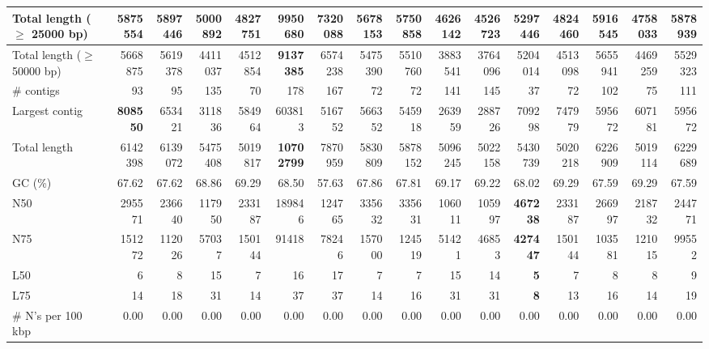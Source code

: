 \documentclass[12pt,a4paper]{article}
\begin{document}
\begin{table}[ht]
\begin{center}
\begin{tabular}{|l*{15}{|r}|}
Total length ($\geq$ 25000 bp) & 5875554 & 5897446 & 5000892 & 4827751 & {\bf 9950680} & 7320088 & 5678153 & 5750858 & 4626142 & 4526723 & 5297446 & 4824460 & 5916545 & 4758033 & 5878939 \\ \hline
Total length ($\geq$ 50000 bp) & 5668875 & 5619378 & 4411037 & 4512854 & {\bf 9137385} & 6574238 & 5475390 & 5510760 & 3883541 & 3764096 & 5204014 & 4513098 & 5655941 & 4469259 & 5529323 \\ \hline
\# contigs & 93 & 95 & 135 & 70 & 178 & 167 & 72 & 72 & 141 & 145 & 37 & 72 & 102 & 75 & 111 \\ \hline
Largest contig & {\bf 808550} & 653421 & 311836 & 584964 & 603813 & 516752 & 566352 & 545918 & 263959 & 288726 & 709298 & 747979 & 595672 & 607181 & 595672 \\ \hline
Total length & 6142398 & 6139072 & 5475408 & 5019817 & {\bf 10702799} & 7870959 & 5830809 & 5878152 & 5096245 & 5022158 & 5430739 & 5020218 & 6226909 & 5019114 & 6229689 \\ \hline
GC (\%) & 67.62 & 67.62 & 68.86 & 69.29 & 68.50 & 57.63 & 67.86 & 67.81 & 69.17 & 69.22 & 68.02 & 69.29 & 67.59 & 69.29 & 67.59 \\ \hline
N50 & 295571 & 236640 & 117950 & 233187 & 189846 & 124765 & 335632 & 335631 & 106011 & 105997 & {\bf 467238} & 233187 & 266997 & 218732 & 244771 \\ \hline
N75 & 151272 & 112026 & 57037 & 150144 & 91418 & 78246 & 157000 & 124519 & 51421 & 46853 & {\bf 427447} & 150144 & 103581 & 121015 & 99552 \\ \hline
L50 & 6 & 8 & 15 & 7 & 16 & 17 & 7 & 7 & 15 & 14 & {\bf 5} & 7 & 8 & 8 & 9 \\ \hline
L75 & 14 & 18 & 31 & 14 & 37 & 37 & 14 & 16 & 31 & 31 & {\bf 8} & 13 & 16 & 14 & 19 \\ \hline
\# N's per 100 kbp & 0.00 & 0.00 & 0.00 & 0.00 & 0.00 & 0.00 & 0.00 & 0.00 & 0.00 & 0.00 & 0.00 & 0.00 & 0.00 & 0.00 & 0.00 \\ \hline
\end{tabular}
\end{center}
\end{table}
\end{document}
